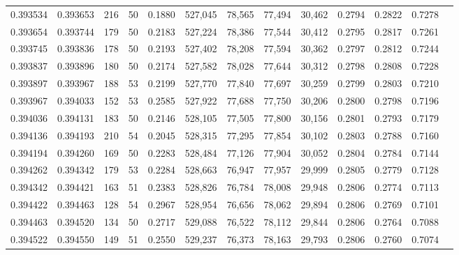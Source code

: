 \begin{tabular}{rrrrrrrrrrrrr}
0.393534 & 0.393653 &   216 &  50 &                                     0.1880 & 527,045 &  78,565 &  77,494 &  30,462 & 0.2794 & 0.2822 & 0.7278 \\
0.393654 & 0.393744 &   179 &  50 &                                     0.2183 & 527,224 &  78,386 &  77,544 &  30,412 & 0.2795 & 0.2817 & 0.7261 \\
0.393745 & 0.393836 &   178 &  50 &                                     0.2193 & 527,402 &  78,208 &  77,594 &  30,362 & 0.2797 & 0.2812 & 0.7244 \\
0.393837 & 0.393896 &   180 &  50 &                                     0.2174 & 527,582 &  78,028 &  77,644 &  30,312 & 0.2798 & 0.2808 & 0.7228 \\
0.393897 & 0.393967 &   188 &  53 &                                     0.2199 & 527,770 &  77,840 &  77,697 &  30,259 & 0.2799 & 0.2803 & 0.7210 \\
0.393967 & 0.394033 &   152 &  53 &                                     0.2585 & 527,922 &  77,688 &  77,750 &  30,206 & 0.2800 & 0.2798 & 0.7196 \\
0.394036 & 0.394131 &   183 &  50 &                                     0.2146 & 528,105 &  77,505 &  77,800 &  30,156 & 0.2801 & 0.2793 & 0.7179 \\
0.394136 & 0.394193 &   210 &  54 &                                     0.2045 & 528,315 &  77,295 &  77,854 &  30,102 & 0.2803 & 0.2788 & 0.7160 \\
0.394194 & 0.394260 &   169 &  50 &                                     0.2283 & 528,484 &  77,126 &  77,904 &  30,052 & 0.2804 & 0.2784 & 0.7144 \\
0.394262 & 0.394342 &   179 &  53 &                                     0.2284 & 528,663 &  76,947 &  77,957 &  29,999 & 0.2805 & 0.2779 & 0.7128 \\
0.394342 & 0.394421 &   163 &  51 &                                     0.2383 & 528,826 &  76,784 &  78,008 &  29,948 & 0.2806 & 0.2774 & 0.7113 \\
0.394422 & 0.394463 &   128 &  54 &                                     0.2967 & 528,954 &  76,656 &  78,062 &  29,894 & 0.2806 & 0.2769 & 0.7101 \\
0.394463 & 0.394520 &   134 &  50 &                                     0.2717 & 529,088 &  76,522 &  78,112 &  29,844 & 0.2806 & 0.2764 & 0.7088 \\
0.394522 & 0.394550 &   149 &  51 &                                     0.2550 & 529,237 &  76,373 &  78,163 &  29,793 & 0.2806 & 0.2760 & 0.7074 \\

\end{tabular}
